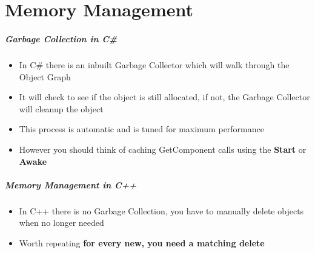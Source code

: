 \part{Memory Management}
\frame{\partpage}

\begin{frame}
\frametitle{Garbage Collection in C\#}
\begin{itemize}
	\item In C\# there is an inbuilt Garbage Collector which will  walk through the Object Graph
	\item It will check to see if the object is still allocated, if not, the Garbage Collector will cleanup the object
	\item This process is automatic and is tuned for maximum performance
	\item However you should think of caching GetComponent calls using the \textbf{Start} or \textbf{Awake}
\end{itemize}
\end{frame}

\begin{frame}
\frametitle{Memory Management in C++}
\begin{itemize}
\item In C++ there is no Garbage Collection, you have to manually delete objects when no longer needed
\item Worth repeating  \textbf{for every new, you need a matching delete}
\end{itemize}
\end{frame}
